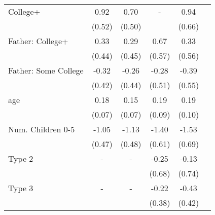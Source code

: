 \begin{tabular}{lccccc}
College+&0.92&0.70&-&0.94&\\&(0.52)&(0.50)&&(0.66)&\\Father: College+&0.33&0.29&0.67&0.33&\\&(0.44)&(0.45)&(0.57)&(0.56)&\\Father: Some College&-0.32&-0.26&-0.28&-0.39&\\&(0.42)&(0.44)&(0.51)&(0.55)&\\age&0.18&0.15&0.19&0.19&\\&(0.07)&(0.07)&(0.09)&(0.10)&\\Num. Children 0-5&-1.05&-1.13&-1.40&-1.53&\\&(0.47)&(0.48)&(0.61)&(0.69)&\\Type 2&-&-&-0.25&-0.13&\\&&&(0.68)&(0.74)&\\Type 3&-&-&-0.22&-0.43&\\&&&(0.38)&(0.42)&\\\bottomrule\end{tabular}